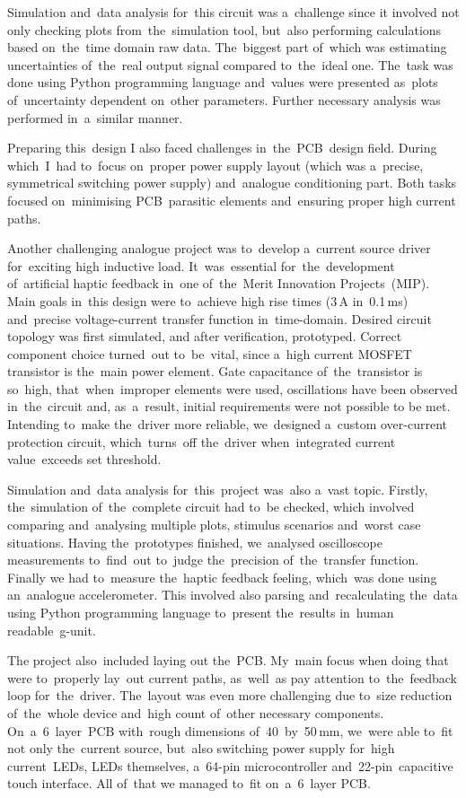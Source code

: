 \documentclass[11pt,a4paper,sans]{article}
\begin{document}
	Simulation and~data analysis for~this circuit was a~challenge since it involved not only
	checking plots from~the~simulation tool, but~also performing calculations based on~the~time 
	domain raw data. The~biggest part of~which was estimating uncertainties of~the~real output 
	signal compared to~the~ideal one. The~task was done using Python programming language
	and~values were presented as~plots of~uncertainty dependent on~other parameters. Further 
	necessary analysis was performed in~a~similar manner.
	
	Preparing this~design I also faced challenges in~the~PCB~design field. During which~I~had 
	to~focus on~proper power supply layout (which was a~precise, symmetrical
	switching power supply) and~analogue conditioning part. Both tasks focused on~minimising 
	PCB~parasitic elements and~ensuring proper high current paths.
	
	Another challenging analogue project was to~develop a~current source driver for~exciting
	high inductive load. It~was~essential for~the~development of~artificial haptic feedback
	in~one of~the~Merit Innovation Projects~(MIP). Main goals in~this design were to~achieve 
	high rise times (3$\,$A in~0.1$\,$ms) and~precise voltage-current transfer function  
	in~time-domain. 
	Desired circuit	topology was first simulated, and after verification, prototyped.  
	Correct component choice turned~out to~be~vital, since a~high current MOSFET transistor is 
	the~main power 
	element. Gate capacitance of~the~transistor is so~high, that~when~improper elements were used, 
	oscillations have been observed in~the~circuit and, as~a~result, initial requirements were not 
	possible to be met. Intending to~make the~driver more reliable, we~designed a~custom 
	over-current protection circuit, which~turns~off the~driver when~integrated current 
	value~exceeds set threshold.
	
	Simulation and~data analysis for~this~project was~also a~vast topic. Firstly, the~simulation
	of~the~complete circuit had to~be checked, which involved comparing and~analysing multiple 
	plots, stimulus scenarios and~worst case situations. Having the~prototypes finished, we~analysed
	oscilloscope measurements to~find~out to~judge the~precision of~the~transfer function.
	Finally we had to~measure the~haptic feedback feeling, which~was done using an~analogue
	accelerometer. This involved also parsing and~recalculating the~data using Python programming
	language to~present the~results in~human readable~g-unit.
	
	The project also~included laying out the~PCB. My~main focus when doing that were to~properly
	lay~out current paths, as~well~as pay attention to~the~feedback loop for~the~driver.
	The~layout was even more challenging due to~size reduction of~the~whole device and~high count 
	of~other necessary components. On~a~6~layer~PCB with~rough dimensions of~40~by~50$\,$mm, we~were
	able to~fit not only the~current source, but~also switching power supply for~high current~LEDs,
	LEDs themselves, a~64-pin microcontroller and~22-pin~capacitive touch interface. All of~that 
	we managed to~fit on~a~6~layer PCB.
	
\end{document}
